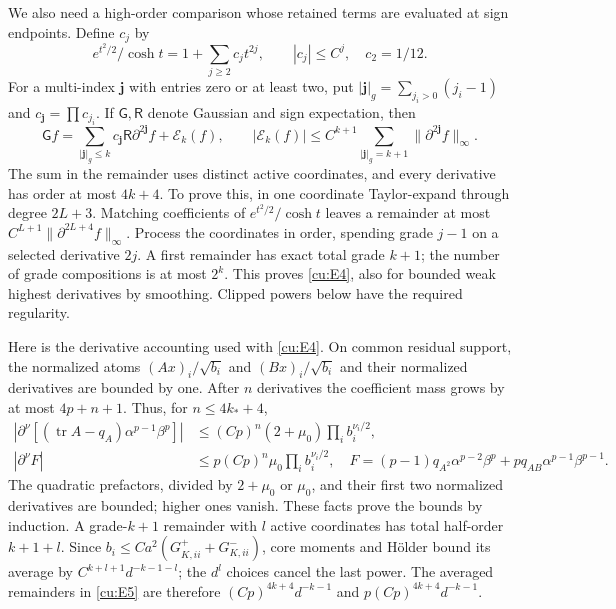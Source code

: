 \documentclass[10pt]{article}
\numberwithin{equation}{section}
\newcommand{\1}{\mathbf1}
\begin{document}
We also need a high-order comparison whose retained terms are evaluated
at sign endpoints. Define $c_j$ by
\[
 e^{t^2/2}/\cosh t=1+\sum_{j\ge2}c_jt^{2j},
 \qquad |c_j|\le C^j,\quad c_2=1/12.
\]
For a multi-index $\mathbf j$ with entries zero or at least two, put
$|\mathbf j|_g=\sum_{j_i>0}(j_i-1)$ and $c_{\mathbf j}=\prod c_{j_i}$.
If $\mathsf G,\mathsf R$ denote Gaussian and sign expectation, then
\[
 \mathsf Gf=\sum_{|\mathbf j|_g\le k}c_{\mathbf j}
       \mathsf R\partial^{2\mathbf j}f+\mathcal E_k(f),\qquad
 |\mathcal E_k(f)|\le C^{k+1}
       \sum_{|\mathbf j|_g=k+1}\|\partial^{2\mathbf j}f\|_\infty.
 \tag{E4}\label{cu:E4}
\]
The sum in the remainder uses distinct active coordinates, and every
derivative has order at most $4k+4$. To prove this, in one coordinate
Taylor-expand through degree $2L+3$. Matching coefficients of
$e^{t^2/2}/\cosh t$ leaves a remainder at most
$C^{L+1}\|\partial^{2L+4}f\|_\infty$. Process the coordinates in order,
spending grade $j-1$ on a selected derivative $2j$. A first remainder
has exact total grade $k+1$; the number of grade compositions is at most
$2^k$. This proves \eqref{cu:E4}, also for bounded weak highest derivatives
by smoothing. Clipped powers below have the required regularity.

Here is the derivative accounting used with \eqref{cu:E4}. On common
residual support, the normalized atoms $(Ax)_i/\sqrt{b_i}$ and
$(Bx)_i/\sqrt{b_i}$ and their normalized derivatives are bounded by one.
After $n$ derivatives the coefficient mass grows by at most $4p+n+1$.
Thus, for $n\le4k_*+4$,
\[
 \begin{split}
 |\partial^\nu[(\operatorname{tr}A-q_A)\alpha^{p-1}\beta^p]|
   &\le(Cp)^n(2+\mu_0)\prod_i b_i^{\nu_i/2},\\
 |\partial^\nu F|&\le p(Cp)^n\mu_0\prod_i b_i^{\nu_i/2},\quad
 F=(p-1)q_{A^2}\alpha^{p-2}\beta^p
                 +pq_{AB}\alpha^{p-1}\beta^{p-1}.
 \end{split} \tag{E5}\label{cu:E5}
\]
The quadratic prefactors, divided by $2+\mu_0$ or $\mu_0$, and their
first two normalized derivatives are bounded; higher ones vanish.
These facts prove the bounds by induction. A grade-$k+1$ remainder
with $l$ active coordinates has total half-order $k+1+l$.
Since $b_i\le Ca^2(G_{K,ii}^++G_{K,ii}^-)$, core moments and H\"older
bound its average by $C^{k+l+1}d^{-k-1-l}$; the $d^l$ choices cancel
the last power. The averaged remainders in \eqref{cu:E5} are therefore
$(Cp)^{4k+4}d^{-k-1}$ and $p(Cp)^{4k+4}d^{-k-1}$.
\end{document}

